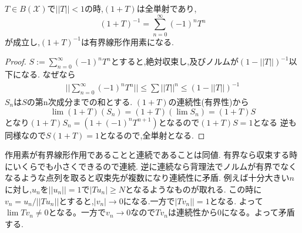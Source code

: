 \documentclass[uplatex]{jsbook}
\begin{document}
\begin{thm}
$T \in B(\mathcal{X})$で$||T|| < 1$の時,$(1+T)$は全単射であり,
\begin{equation*}
 (1+T)^{-1}  = \sum_{n=0}^{\infty} (-1)^{n}T ^{n}
\end{equation*}
が成立し,$(1+T)^{-1}$は有界線形作用素になる.
\end{thm}
\begin{proof}
 $S:= \sum_{n=0}^{\infty} (-1)^{n}T ^{n}$とすると,絶対収束し,及びノルムが$(1- ||T||)^{-1}$以下になる.
 なぜなら
 \begin{align*}
 ||\sum_{n=0}^{\infty} (-1)^{n}T ^{n}|| \le \sum ||T||^n  \le (1 - ||T||)^{-1}
 \end{align*}
$S_n$は$S$の第n次成分までの和とする.
$(1+T)$の連続性(有界性)から
\begin{equation*}
    \lim (1+T)(S_n) = (1+T)(\lim S_n) = (1+T)S
\end{equation*}
となり$(1+T)S_n = (1+(-1)^{n}T^{n+1})$となるので$(1+T)S = 1$となる
逆も同様なので$S(1+T)=1$となるので,全単射となる.
\end{proof}

\begin{rem}
 作用素が有界線形作用であることと連続であることは同値.
 有界なら収束する時にいくらでも小さくできるので連続.
 逆に連続なら背理法でノルムが有界でなくなるような点列を取ると収束先が複数になり連続性に矛盾.
 例えば十分大きい$n$に対し,$u_n$を$||u_n|| = 1$で$|Tu_n| \ge N$となるようなものが取れる.
 この時に$v_n = u_n / ||Tu_n||$とすると,$|v_n | \to 0$になる.一方で$|Tv_n|| = 1$となる.
 よって$\lim Tv_n \neq 0$となる。一方で$v_n \to 0$なので$Tv_n$は連続性から0になる。よって矛盾する.
\end{rem}
\end{document}
